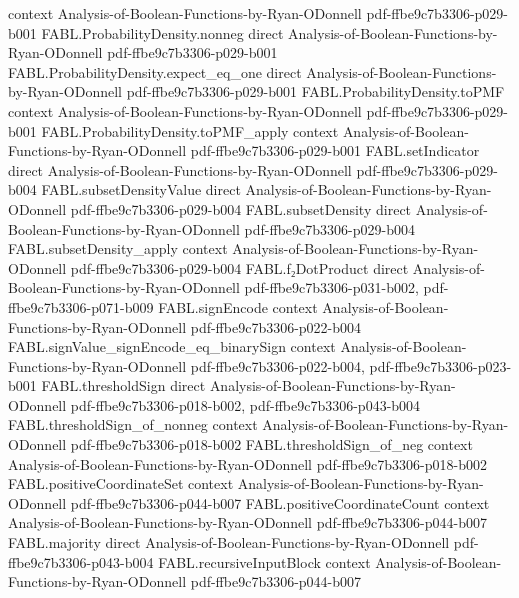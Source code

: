 \begin{theorem}
  {context}
  {Analysis-of-Boolean-Functions-by-Ryan-ODonnell}
  {pdf-ffbe9c7b3306-p029-b001}
\proofstep
  {FABL.ProbabilityDensity.nonneg}
  {direct}
  {Analysis-of-Boolean-Functions-by-Ryan-ODonnell}
  {pdf-ffbe9c7b3306-p029-b001}
\proofstep
  {FABL.ProbabilityDensity.expect_eq_one}
  {direct}
  {Analysis-of-Boolean-Functions-by-Ryan-ODonnell}
  {pdf-ffbe9c7b3306-p029-b001}
\proofstep
  {FABL.ProbabilityDensity.toPMF}
  {context}
  {Analysis-of-Boolean-Functions-by-Ryan-ODonnell}
  {pdf-ffbe9c7b3306-p029-b001}
\proofstep
  {FABL.ProbabilityDensity.toPMF_apply}
  {context}
  {Analysis-of-Boolean-Functions-by-Ryan-ODonnell}
  {pdf-ffbe9c7b3306-p029-b001}
\proofstep
  {FABL.setIndicator}
  {direct}
  {Analysis-of-Boolean-Functions-by-Ryan-ODonnell}
  {pdf-ffbe9c7b3306-p029-b004}
\proofstep
  {FABL.subsetDensityValue}
  {direct}
  {Analysis-of-Boolean-Functions-by-Ryan-ODonnell}
  {pdf-ffbe9c7b3306-p029-b004}
\proofstep
  {FABL.subsetDensity}
  {direct}
  {Analysis-of-Boolean-Functions-by-Ryan-ODonnell}
  {pdf-ffbe9c7b3306-p029-b004}
\proofstep
  {FABL.subsetDensity_apply}
  {context}
  {Analysis-of-Boolean-Functions-by-Ryan-ODonnell}
  {pdf-ffbe9c7b3306-p029-b004}
\proofstep
  {FABL.f₂DotProduct}
  {direct}
  {Analysis-of-Boolean-Functions-by-Ryan-ODonnell}
  {pdf-ffbe9c7b3306-p031-b002,
    pdf-ffbe9c7b3306-p071-b009}
\proofstep
  {FABL.signEncode}
  {context}
  {Analysis-of-Boolean-Functions-by-Ryan-ODonnell}
  {pdf-ffbe9c7b3306-p022-b004}
\proofstep
  {FABL.signValue_signEncode_eq_binarySign}
  {context}
  {Analysis-of-Boolean-Functions-by-Ryan-ODonnell}
  {pdf-ffbe9c7b3306-p022-b004,
    pdf-ffbe9c7b3306-p023-b001}
\proofstep
  {FABL.thresholdSign}
  {direct}
  {Analysis-of-Boolean-Functions-by-Ryan-ODonnell}
  {pdf-ffbe9c7b3306-p018-b002,
    pdf-ffbe9c7b3306-p043-b004}
\proofstep
  {FABL.thresholdSign_of_nonneg}
  {context}
  {Analysis-of-Boolean-Functions-by-Ryan-ODonnell}
  {pdf-ffbe9c7b3306-p018-b002}
\proofstep
  {FABL.thresholdSign_of_neg}
  {context}
  {Analysis-of-Boolean-Functions-by-Ryan-ODonnell}
  {pdf-ffbe9c7b3306-p018-b002}
\proofstep
  {FABL.positiveCoordinateSet}
  {context}
  {Analysis-of-Boolean-Functions-by-Ryan-ODonnell}
  {pdf-ffbe9c7b3306-p044-b007}
\proofstep
  {FABL.positiveCoordinateCount}
  {context}
  {Analysis-of-Boolean-Functions-by-Ryan-ODonnell}
  {pdf-ffbe9c7b3306-p044-b007}
\proofstep
  {FABL.majority}
  {direct}
  {Analysis-of-Boolean-Functions-by-Ryan-ODonnell}
  {pdf-ffbe9c7b3306-p043-b004}
\proofstep
  {FABL.recursiveInputBlock}
  {context}
  {Analysis-of-Boolean-Functions-by-Ryan-ODonnell}
  {pdf-ffbe9c7b3306-p044-b007}

\end{theorem}
